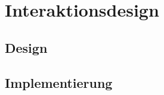 \chapter{Interaktionsdesign}
\section{Design} \label{sec:interactionDesign}
 
\section{Implementierung} \label{sec:interactionImplementation}
